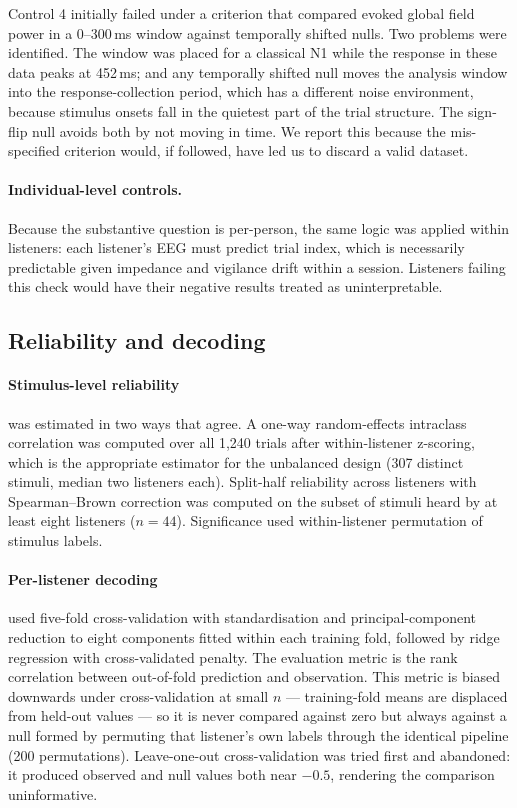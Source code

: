 Control 4 initially failed under a criterion that compared evoked global field
power in a 0--300\,ms window against temporally shifted nulls. Two problems were
identified. The window was placed for a classical N1 while the response in these
data peaks at 452\,ms; and any temporally shifted null moves the analysis window
into the response-collection period, which has a different noise environment,
because stimulus onsets fall in the quietest part of the trial structure. The
sign-flip null avoids both by not moving in time. We report this because the
mis-specified criterion would, if followed, have led us to discard a valid dataset.

\paragraph{Individual-level controls.}
Because the substantive question is per-person, the same logic was applied within
listeners: each listener's EEG must predict trial index, which is necessarily
predictable given impedance and vigilance drift within a session. Listeners failing
this check would have their negative results treated as uninterpretable.

\subsection*{Reliability and decoding}

\paragraph{Stimulus-level reliability}
was estimated in two ways that agree. A one-way random-effects intraclass
correlation was computed over all 1,240 trials after within-listener z-scoring,
which is the appropriate estimator for the unbalanced design (307 distinct stimuli,
median two listeners each). Split-half reliability across listeners with
Spearman--Brown correction was computed on the subset of stimuli heard by at least
eight listeners ($n = 44$). Significance used within-listener permutation of
stimulus labels.

\paragraph{Per-listener decoding}
used five-fold cross-validation with standardisation and principal-component
reduction to eight components fitted within each training fold, followed by ridge
regression with cross-validated penalty. The evaluation metric is the rank
correlation between out-of-fold prediction and observation. This metric is biased
downwards under cross-validation at small $n$ --- training-fold means are displaced
from held-out values --- so it is never compared against zero but always against a
null formed by permuting that listener's own labels through the identical pipeline
(200 permutations). Leave-one-out cross-validation was tried first and abandoned:
it produced observed and null values both near $-0.5$, rendering the comparison
uninformative.

